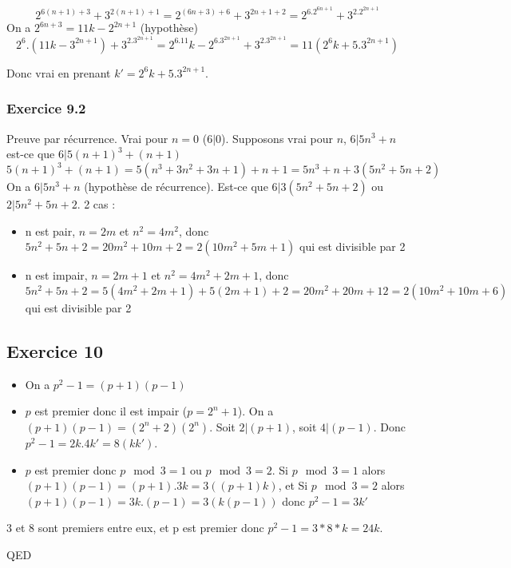 \documentclass[]{book}
\theoremstyle{definition}
\begin{document}
$$2^{6(n+1)+3}+3^{2(n+1)+1} = 2^{(6n+3)+6}+3^{2n+1+2} = 2^6.2^{6n+1}+3^2.2^{2n+1}$$
On a $2^{6n+3} = 11k - 2^{2n+1}$ (hypoth\`ese)
$$2^6.(11k - 3^{2n+1}) + 3^2.3^{2n+1} = 2^6.11k - 2^6.3^{2n+1} + 3^2.3^{2n+1} = 11(2^6k+5.3^{2n+1})$$

Donc vrai en prenant $k' = 2^6k+5.3^{2n+1}$.

\subsubsection*{Exercice 9.2}
Preuve par r\'ecurrence. Vrai pour $n=0$ ($6|0$). Supposons vrai pour $n$, $6|5n^3+n$ est-ce que $6|5(n+1)^3+(n+1)$
$$
5(n+1)^3+(n+1) = 5(n^3+3n^2+3n+1)+n+1 = 5n^3+n +3(5n^2+5n+2)
$$
On a $6|5n^3+n$ (hypoth\`ese de r\'ecurrence). Est-ce que $6|3(5n^2+5n+2)$ ou $2|5n^2+5n+2$. 2 cas :
\begin{itemize}
\item n est pair, $n=2m$ et $n^2=4m^2$, donc $5n^2+5n+2=20m^2+10m+2=2(10m^2+5m+1)$ qui est divisible par 2
\item n est impair, $n=2m+1$ et $n^2=4m^2+2m+1$, donc $5n^2+5n+2=5(4m^2+2m+1)+5(2m+1) +2 = 20m^2+20m+12 = 2(10m^2+10m+6)$ qui est divisible par 2
\end{itemize}


\subsection*{Exercice 10}
\begin{itemize}
\item On a $p^2-1 = (p+1)(p-1)$
\item $p$ est premier donc il est impair ($p=2^n+1$). On a $(p+1)(p-1) = (2^n+2)(2^n)$. Soit $2|(p+1)$, soit $4|(p-1)$. Donc $p^2-1=2k.4k' = 8(kk')$.
\item $p$ est premier donc $p \mod 3 =1$ ou $p \mod 3 =2$. Si $p \mod 3 =1$  alors $(p+1)(p-1) = (p+1).3k = 3((p+1)k)$, et Si $p \mod 3 =2$  alors $(p+1)(p-1) = 3k.(p-1) = 3(k(p-1))$ donc $p^2-1 = 3k'$
\end{itemize}

3 et 8 sont premiers entre eux, et p est premier donc $p^2-1=3*8*k = 24k$.

QED
\end{document}
